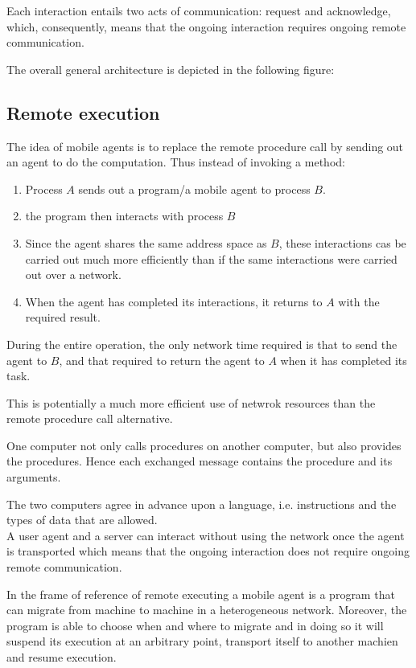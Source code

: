 Each interaction entails two acts of communication: request and acknowledge, which, consequently, means that the ongoing interaction requires ongoing remote communication.

The overall general architecture is depicted in the following figure:

\subsection{Remote execution}
The idea of mobile agents is to replace the remote procedure call by sending out an agent to do the computation. Thus instead of invoking a method:
\begin{enumerate}
\item Process $A$ sends out a program/a mobile agent to process $B$.
\item the program then interacts with process $B$
\item Since the agent shares the same address space as $B$, these interactions cas be carried out much more efficiently than if the same interactions were carried out over a network.
\item When the agent has completed its interactions, it returns to $A$ with the required result.
\end{enumerate}

During the entire operation, the only network time required is that to send the agent to $B$, and that required to return the agent to $A$ when it has completed its task.

This is potentially a much more efficient use of netwrok resources than the remote procedure call alternative.

One computer not only calls procedures on another computer, but also provides the procedures. Hence each exchanged message contains the procedure and its arguments.

The two computers agree in advance upon a language, i.e. instructions and the types of data that are allowed.\\
A user agent and a server can interact without using the network once the agent is transported which means that the ongoing interaction does not require ongoing remote communication.

In the frame of reference of remote executing a mobile agent is a program that can migrate from machine to machine in a heterogeneous network. Moreover, the program is able to choose when and where to migrate and in doing so it will suspend its execution at an arbitrary point, transport itself to another machien and resume execution.

